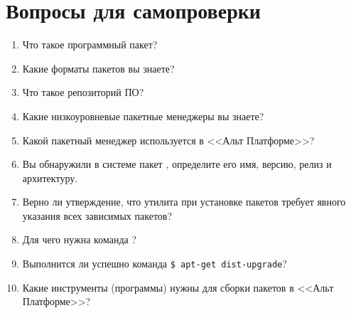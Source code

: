 \section{Вопросы для самопроверки}

\begin{enumerate}
	\item Что такое программный пакет?
	\item Какие форматы пакетов вы знаете?
	\item Что такое репозиторий ПО?
	\item Какие низкоуровневые пакетные менеджеры вы знаете?
	\item Какой пакетный менеджер используется в <<Альт Платформе>>?
	\item Вы обнаружили в системе пакет , определите его имя, версию, релиз и архитектуру.
	\item Верно ли утверждение, что утилита  при установке пакетов требует явного указания всех зависимых пакетов?
	\item Для чего нужна команда ?
	\item Выполнится ли успешно команда \verb!$ apt-get dist-upgrade!?
	\item Какие инструменты (программы) нужны для сборки пакетов в <<Альт Платформе>>?
\end{enumerate}
